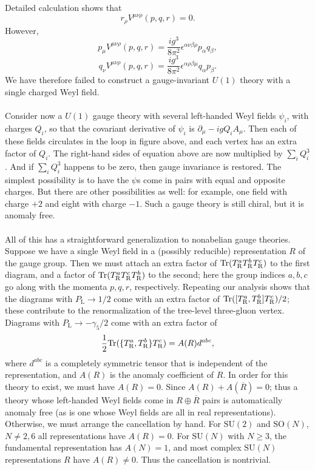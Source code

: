 \noindent
Detailed calculation shows that
\[r_{\rho}V^{\mu\nu\rho}(p,q,r) = 0.\]
However,
\[p_{\mu}V^{\mu\nu\rho}(p,q,r) = \frac{ig^3}{8\pi^2}\epsilon^{\alpha\nu\beta\rho}p_{\alpha}q_{\beta},\]
\[q_{\nu}V^{\mu\nu\rho}(p,q,r) = \frac{ig^3}{8\pi^2}\epsilon^{\alpha\rho\beta\mu}q_{\alpha}p_{\beta}.\]
We have therefore failed to construct a gauge-invariant $U(1)$ theory with a single charged Weyl field.
\\ \\
Consider now a $U(1)$ gauge theory with several left-handed Weyl fields $\psi_i$, with charges $Q_i$, so that the covariant derivative of $\psi_i$ is $\partial_{\mu} - igQ_iA_{\mu}$. Then each of these fields circulates in the loop in figure above, and each vertex has an extra factor of $Q_i$. The right-hand sides of equation above are now multiplied by $\sum_i Q_i^3$. And if $\sum_i Q_i^3$ happens to be zero, then gauge invariance is restored. 
The simplest possibility is to have the $\psi$s come in
pairs with equal and opposite charges. But there are other possibilities as well: for example, one field with charge $+2$ and eight with charge $-1$. Such a gauge theory is still chiral, but it is anomaly free.
\\ \\
All of this has a straightforward generalization to nonabelian gauge theories. 
Suppose we have a single Weyl field in a (possibly reducible) representation $R$ of the gauge group. Then we must attach an extra factor of $\mathrm{Tr}(T^a_{\rm R} T^b_{\rm R} T^c_{\rm R})$ to the first diagram, and a factor of $\mathrm{Tr}(T^a_{\rm R} T^c_{\rm R} T^b_{\rm R})$ to the second; here the group indices $a,b,c$ go along with the momenta $p,q,r$, respectively.
Repeating our analysis shows that the diagrams with $P_{\mathrm{L}} \to 1/2$ come with an extra factor of $\mathrm{Tr}([T^a_{\rm R}, T^b_{\rm R}] T^c_{\rm R})/2$; these contribute to the renormalization of the tree-level three-gluon vertex. Diagrams with $P_{\mathrm{L}} \to - \gamma_5/2$ come with an extra factor of
\[\frac{1}{2}\mathrm{Tr}(\{T^a_{\rm R}, T^b_{\rm R}\} T^c_{\rm R}) = A(R)d^{abc},\]
where $d^{abc}$ is a completely symmetric tensor that is independent of the representation, and $A(R)$ is the anomaly coefficient of $R$. In order for this theory to exist, we must have $A(R) = 0$. 
Since $A(R) + A(\overline{R}) = 0$; thus a theory whose left-handed Weyl fields come in $R \oplus \overline{R}$ pairs is automatically anomaly free (as is one whose Weyl fields are all in real representations). Otherwise, we must arrange the cancellation by hand. 
For $\mathrm{SU}(2)$ and $\mathrm{SO}(N)$, $N \neq 2,6$ all representations have $A(R) = 0$. For $\mathrm{SU}(N)$ with $N \geq 3$, the fundamental representation has $A(N) = 1$, and most complex $\mathrm{SU}(N)$ representations $R$ have $A(R) \neq 0$. Thus the cancellation is nontrivial.

